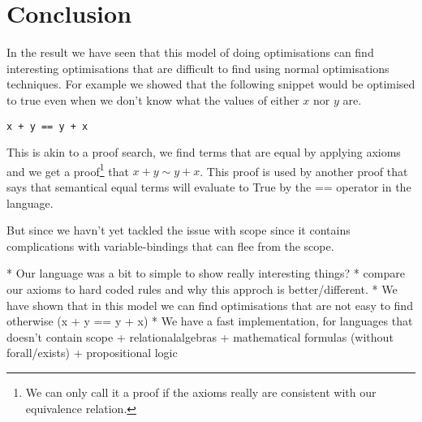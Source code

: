 
\section{Conclusion}
In the result we have seen that this model of doing optimisations can find interesting
optimisations that are difficult to find using normal optimisations techniques\cite{santos}.
For example we showed that the following snippet would be optimised to true even
when we don't know what the values of either $x$ nor $y$ are.

\begin{verbatim}
x + y == y + x
\end{verbatim}

This is akin to a proof search, we find terms that are equal by applying axioms
and we get a proof\footnote{We can only call it a proof if the axioms really are 
consistent with our equivalence relation.} that $x + y \sim y + x$. This proof
is used by another proof that says that semantical equal terms will evaluate to 
True by the == operator in the language.

But since we havn't yet tackled the issue with scope since it contains complications
with variable-bindings that can flee from the scope. 

* Our language was a bit to simple to show really interesting things?
* compare our axioms to hard coded rules and why this approch is better/different.
* We have shown that in this model we can find optimisations that are not easy
to find otherwise (x + y == y + x) 
* We have a fast implementation, for languages that doesn't contain scope 
 + relationalalgebras
 + mathematical formulas (without forall/exists)
 + propositional logic
 
